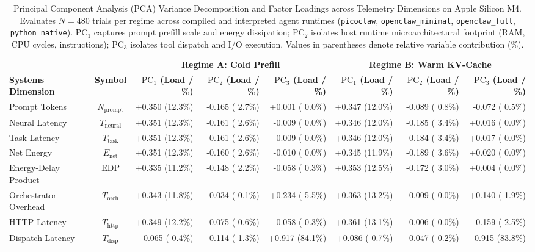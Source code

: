 \begin{table}[t]
\centering
\caption{Principal Component Analysis (PCA) Variance Decomposition and Factor Loadings across Telemetry Dimensions on Apple Silicon M4. Evaluates $N=480$ trials per regime across compiled and interpreted agent runtimes (\texttt{picoclaw}, \texttt{openclaw\_minimal}, \texttt{openclaw\_full}, \texttt{python\_native}). $\text{PC}_1$ captures prompt prefill scale and energy dissipation; $\text{PC}_2$ isolates host runtime microarchitectural footprint (RAM, CPU cycles, instructions); $\text{PC}_3$ isolates tool dispatch and I/O execution. Values in parentheses denote relative variable contribution (\%).}
\label{tab:pca_loadings}
\small
\begin{tabular}{l c r r r r r r}
\hline
 & & \multicolumn{3}{c}{\textbf{Regime A: Cold Prefill}} & \multicolumn{3}{c}{\textbf{Regime B: Warm KV-Cache}} \\
\cmidrule(lr){3-5} \cmidrule(lr){6-8}
\textbf{Systems Dimension} & \textbf{Symbol} & \textbf{$\text{PC}_1$ (Load / \%)} & \textbf{$\text{PC}_2$ (Load / \%)} & \textbf{$\text{PC}_3$ (Load / \%)} & \textbf{$\text{PC}_1$ (Load / \%)} & \textbf{$\text{PC}_2$ (Load / \%)} & \textbf{$\text{PC}_3$ (Load / \%)} \\
\hline
Prompt Tokens & $N_{\text{prompt}}$ & +0.350 (12.3\%) & -0.165 ( 2.7\%) & +0.001 ( 0.0\%) & +0.347 (12.0\%) & -0.089 ( 0.8\%) & -0.072 ( 0.5\%) \\
Neural Latency & $T_{\text{neural}}$ & +0.351 (12.3\%) & -0.161 ( 2.6\%) & -0.009 ( 0.0\%) & +0.346 (12.0\%) & -0.185 ( 3.4\%) & +0.016 ( 0.0\%) \\
Task Latency & $T_{\text{task}}$ & +0.351 (12.3\%) & -0.161 ( 2.6\%) & -0.009 ( 0.0\%) & +0.346 (12.0\%) & -0.184 ( 3.4\%) & +0.017 ( 0.0\%) \\
Net Energy & $E_{\text{net}}$ & +0.351 (12.3\%) & -0.160 ( 2.6\%) & -0.010 ( 0.0\%) & +0.345 (11.9\%) & -0.189 ( 3.6\%) & +0.020 ( 0.0\%) \\
Energy-Delay Product & EDP & +0.335 (11.2\%) & -0.148 ( 2.2\%) & -0.058 ( 0.3\%) & +0.353 (12.5\%) & -0.172 ( 3.0\%) & +0.004 ( 0.0\%) \\
Orchestrator Overhead & $T_{\text{orch}}$ & +0.343 (11.8\%) & -0.034 ( 0.1\%) & +0.234 ( 5.5\%) & +0.363 (13.2\%) & +0.009 ( 0.0\%) & +0.140 ( 1.9\%) \\
HTTP Latency & $T_{\text{http}}$ & +0.349 (12.2\%) & -0.075 ( 0.6\%) & -0.058 ( 0.3\%) & +0.361 (13.1\%) & -0.006 ( 0.0\%) & -0.159 ( 2.5\%) \\
Dispatch Latency & $T_{\text{disp}}$ & +0.065 ( 0.4\%) & +0.114 ( 1.3\%) & +0.917 (84.1\%) & +0.086 ( 0.7\%) & +0.047 ( 0.2\%) & +0.915 (83.8\%) \\

\end{tabular}
\end{table}

